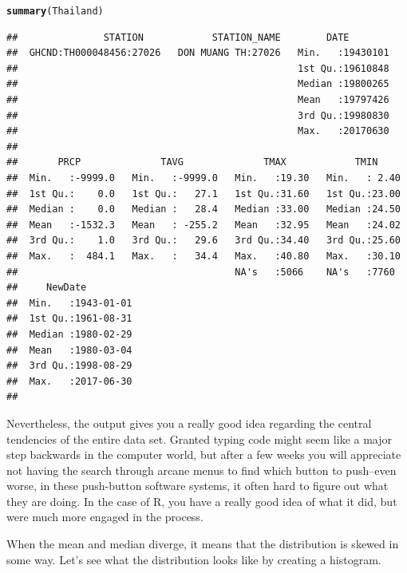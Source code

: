 \documentclass{article}\usepackage[]{graphicx}\usepackage[]{color}
\makeatletter
\newcommand{\hlstd}[1]{\textcolor[rgb]{0.345,0.345,0.345}{#1}}%
\newcommand{\hlkwd}[1]{\textcolor[rgb]{0.737,0.353,0.396}{\textbf{#1}}}%
\newenvironment{kframe}{%
 \def\at@end@of@kframe{}%
 \ifinner\ifhmode%
  \def\at@end@of@kframe{\end{minipage}}%
  \begin{minipage}{\columnwidth}%
 \fi\fi%
 \def\FrameCommand##1{\hskip\@totalleftmargin \hskip-\fboxsep
 \colorbox{shadecolor}{##1}\hskip-\fboxsep
     \hskip-\linewidth \hskip-\@totalleftmargin \hskip\columnwidth}%
 \MakeFramed {\advance\hsize-\width
   \@totalleftmargin\z@ \linewidth\hsize
   \@setminipage}}%
 {\par\unskip\endMakeFramed%
 \at@end@of@kframe}
\newenvironment{knitrout}{}{} %
\makeatother
\begin{document}
\begin{knitrout}
\color{fgcolor}\begin{kframe}
\begin{alltt}
\hlkwd{summary}\hlstd{(Thailand)}
\end{alltt}
\begin{verbatim}
##               STATION            STATION_NAME        DATE         
##  GHCND:TH000048456:27026   DON MUANG TH:27026   Min.   :19430101  
##                                                 1st Qu.:19610848  
##                                                 Median :19800265  
##                                                 Mean   :19797426  
##                                                 3rd Qu.:19980830  
##                                                 Max.   :20170630  
##                                                                   
##       PRCP              TAVG              TMAX            TMIN      
##  Min.   :-9999.0   Min.   :-9999.0   Min.   :19.30   Min.   : 2.40  
##  1st Qu.:    0.0   1st Qu.:   27.1   1st Qu.:31.60   1st Qu.:23.00  
##  Median :    0.0   Median :   28.4   Median :33.00   Median :24.50  
##  Mean   :-1532.3   Mean   : -255.2   Mean   :32.95   Mean   :24.02  
##  3rd Qu.:    1.0   3rd Qu.:   29.6   3rd Qu.:34.40   3rd Qu.:25.60  
##  Max.   :  484.1   Max.   :   34.4   Max.   :40.80   Max.   :30.10  
##                                      NA's   :5066    NA's   :7760   
##     NewDate          
##  Min.   :1943-01-01  
##  1st Qu.:1961-08-31  
##  Median :1980-02-29  
##  Mean   :1980-03-04  
##  3rd Qu.:1998-08-29  
##  Max.   :2017-06-30  
## 
\end{verbatim}
\end{kframe}
\end{knitrout}



Nevertheless, the output gives you a really good idea regarding the central tendencies of the entire data set.  Granted typing code might seem like a major step backwards in the computer world, but after a few weeks you will appreciate not having the search through arcane menus to find which button to push--even worse, in these push-button software systems, it often hard to figure out what they are doing. In the case of R, you have a really good idea of what it did, but were much more engaged in the process.

When the mean and median diverge, it means that the distribution is skewed in some way. Let's see what the distribution looks like by creating a histogram.
\end{document}
